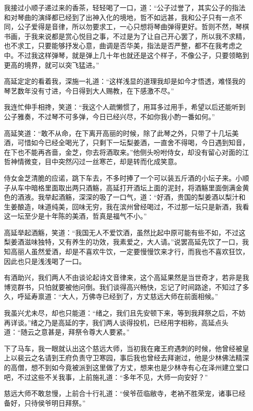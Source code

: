 我接过小顺子递过来的香茶，轻轻喝了一口，道：“公子过誉了，其实公子的指法和对琴曲的演绎都已经到了出神入化的境地，哲不如远甚，我和公子只有一点不同，公子爱得是音律，所以勿要求工，一心只想将琴曲弹得更好。哲则不然，琴棋书画，于我来说都是赏心悦目之事，不过是为了让自己开心罢了，所以我不求精，也不求工，只要能够抒发心意，曲调是否华美，指法是否严整，都不在我考虑之中。不过我这样弹琴，就是弹上几十年也就还是这个样子，不像公子，只要领略到更高的境界，就可以突飞猛进。”

高延定定的看着我，深施一礼道：“这样浅显的道理我却是如今才悟透，难怪我的琴艺数年没有寸进，今日得到大人赐教，在下感激不尽。”

我连忙伸手相搀，笑道：“我这个人疏懒惯了，用耳多过用手，希望以后还能听到公子雅奏，不过琴不可多弹，今日已经兴尽，不如你我小酌一番如何。”

高延笑道：“敢不从命，在下离开高丽的时候，除了此琴之外，只带了十几坛美酒，可惜如今已经全喝光了，只剩下一坛梨姜酒，一直舍不得喝，今日遇到知音，在下也不能再吝啬，金芝，你去将酒取来。”他侧头吩咐侍女，却没有留心对面的江哲神情微变，目中突然闪过一丝寒芒，却是转而化成笑意。

侍女金芝清脆的应诺，跳下车去，不多时捧了一个可以装五斤酒的小坛子来。小顺子从车中暗格里面取出两只酒觞，高延打开酒坛上面的泥封，将酒觞里面倒满金黄色的酒液。我举起酒觞，深深的吸了一口气，道：“好酒，贵国的梨姜酒以梨汁和生姜酿造，味道纯美，回味无穷，我在滨州曾经喝过，不过那一坛只是新酒，我看这一坛至少是十年陈的美酒，哲真是福气不小。”

高延举起酒觞，笑道：“我国无人不爱饮酒，虽然比起中原可能有些不如，不过这梨姜酒滋味独特，又有养生的功效，我素爱之，大人请。”说罢高延先饮了一口，我知高丽人虽然爱酒，却是不喜欢牛饮，一定要慢慢饮来才行，而我也不喜欢狂饮，因此也只是浅浅喝了一口。

有酒助兴，我们两人不由谈论起诗文音律来，这个高延果然是当世奇才，若非是我博览群书，只怕就要被他问倒。我们谈得高兴畅快，忘记了时间路途，不知过了多久，呼延寿禀道：“大人，万佛寺已经到了，方丈慈远大师在前面相候。”

我虽兴尤未尽，却也只能道：“绪之，我们且先安顿下来，等到我拜祭之后，不妨再详谈。”绪之乃是高延的字，我们两人谈得投机，已经用字相称，高延点头道：“随云之意甚是，拜祭令尊大人要紧。”

下了马车，我一眼就认出这个慈远大师，当初我在雍王府遇刺的时候，他曾经被皇上以裴云之名请到王府负责守卫寒园，事后我也曾经去拜谢过，他是少林佛法精深的高僧，想不到如今竟被派到这里做了方丈，想来也是少林寺有心在泽州建立堂口吧，不过这些不关我事，上前施礼道：“多年不见，大师一向安好？”

慈远大师不敢怠慢，上前合十行礼道：“侯爷莅临敝寺，老衲不胜荣宠，诸事已经备好，只待侯爷明日拜祭。”

